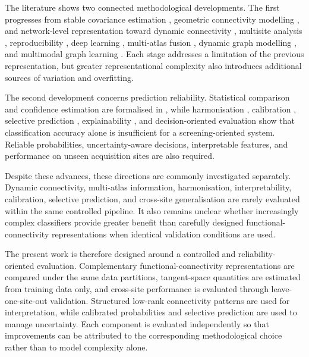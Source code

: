 \documentclass[a4paper,fleqn]{cas-sc}
\begin{document}
The literature shows two connected methodological developments. The first progresses from stable covariance estimation \cite{LedoitWolf2004}, geometric connectivity modelling \cite{Varoquauxetal2010}, and network-level representation \cite{Yeoetal2011} toward dynamic connectivity \cite{Hutchisonetal2013,LeonardiVanDeVille2015,Pretietal2017}, multisite analysis \cite{DiMartinoetal2014}, reproducibility \cite{Abrahametal2017}, deep learning \cite{Heinsfeldetal2018,Eslamietal2019,AlmuqhimSaeed2021}, multi-atlas fusion \cite{Liuetal2024MADE}, dynamic graph modelling \cite{Tangetal2025GNNLSTM}, and multimodal graph learning \cite{Tangetal2026CASGNN}. Each stage addresses a limitation of the previous representation, but greater representational complexity also introduces additional sources of variation and overfitting.

The second development concerns prediction reliability. Statistical comparison and confidence estimation are formalised in \cite{ClopperPearson1934,Demsar2006}, while harmonisation \cite{Johnsonetal2007,Fortinetal2018}, calibration \cite{Guoetal2017}, selective prediction \cite{GeifmanElYaniv2017}, explainability \cite{LundbergLee2017}, and decision-oriented evaluation \cite{VanCalsteretal2018} show that classification accuracy alone is insufficient for a screening-oriented system. Reliable probabilities, uncertainty-aware decisions, interpretable features, and performance on unseen acquisition sites are also required.

Despite these advances, these directions are commonly investigated separately. Dynamic connectivity, multi-atlas information, harmonisation, interpretability, calibration, selective prediction, and cross-site generalisation are rarely evaluated within the same controlled pipeline. It also remains unclear whether increasingly complex classifiers provide greater benefit than carefully designed functional-connectivity representations when identical validation conditions are used.

The present work is therefore designed around a controlled and reliability-oriented evaluation. Complementary functional-connectivity representations are compared under the same data partitions, tangent-space quantities are estimated from training data only, and cross-site performance is evaluated through leave-one-site-out validation. Structured low-rank connectivity patterns are used for interpretation, while calibrated probabilities and selective prediction are used to manage uncertainty. Each component is evaluated independently so that improvements can be attributed to the corresponding methodological choice rather than to model complexity alone.




\end{document}

